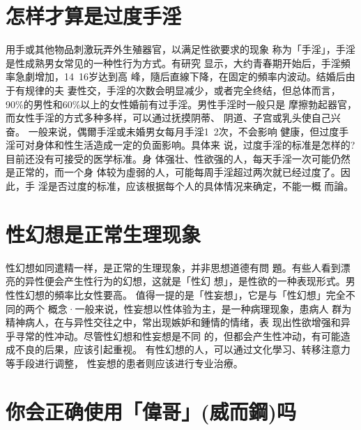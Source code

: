 \documentclass[12pt,UTF8]{ctexbook}
\begin{document}
\section{怎样才算是过度手淫}

用手或其他物品刺激玩弄外生殖器官，以满足性欲要求的现象
称为「手淫」，手淫是性成熟男女常见的一种性行为方式。有研究
显示，大约青春期开始后，手淫頻率急劇增加，14~16岁达到高
峰，隨后直線下降，在固定的頻率内波动。结婚后由于有规律的夫
妻性交，手淫的次数会明显减少，或者完全终结，但总体而言，
90\%的男性和60\%以上的女性婚前有过手淫。男性手淫时一般只是
摩擦勃起器官，而女性手淫的方式多种多样，可以通过抚摸阴蒂、
阴道、子宫或乳头使自己兴奋。
一般来说，偶爾手淫或未婚男女每月手淫1~2次，不会影响
健康，但过度手淫可对身体和性生活造成一定的负面影响。具体来
说，过度手淫的标准是怎样的?目前还没有可接受的医学标准。身
体强壮、性欲强的人，每天手淫一次可能仍然是正常的，而一个身
体较为虛弱的人，可能每周手淫超过两次就已经过度了。因此，手
淫是否过度的标准，应该根据每个人的具体情况来确定，不能一概
而論。
\section{性幻想是正常生理现象}
性幻想如同遣精一样，是正常的生理现象，并非思想道德有問
題。有些人看到漂亮的异性便会产生性行为的幻想，这就是「性幻
想」，是性欲的一种表现形式。男性性幻想的頻率比女性要高。
值得一提的是「性妄想」，它是与「性幻想」完全不同的两个
概念·一般来说，性妄想以性体验为主，是一种病理现象，患病人
群为精神病人，在与异性交往之中，常出现嫉妒和鍾情的情绪，表
现出性欲增强和异乎寻常的性冲动。尽管性幻想和性妄想是不同
的，但都会产生性冲动，有可能造成不良的后果，应该引起重视。
有性幻想的人，可以通过文化學习、转移注意力等手段进行调整，
性妄想的患者则应该进行专业治療。

\section{你会正确使用「偉哥」(威而鋼)吗}
\end{document}
